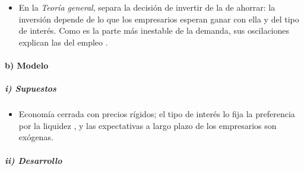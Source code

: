 \documentclass[11pt]{article}
\begin{document}
\begin{itemize}
\item En la \emph{Teoría general}, \textcite[caps.~11 y 12]{Keynes1936} separa la decisión de invertir de la de ahorrar: la inversión depende de lo que los empresarios esperan ganar con ella y del tipo de interés. Como es la parte más inestable de la demanda, sus oscilaciones explican las del empleo .
\end{itemize}

\paragraph{b) Modelo}

\subparagraph{i) Supuestos}

\begin{itemize}
\item Economía cerrada con precios rígidos; el tipo de interés lo fija la preferencia por la liquidez , y las expectativas a largo plazo de los empresarios son exógenas.
\end{itemize}

\subparagraph{ii) Desarrollo}
\end{document}
